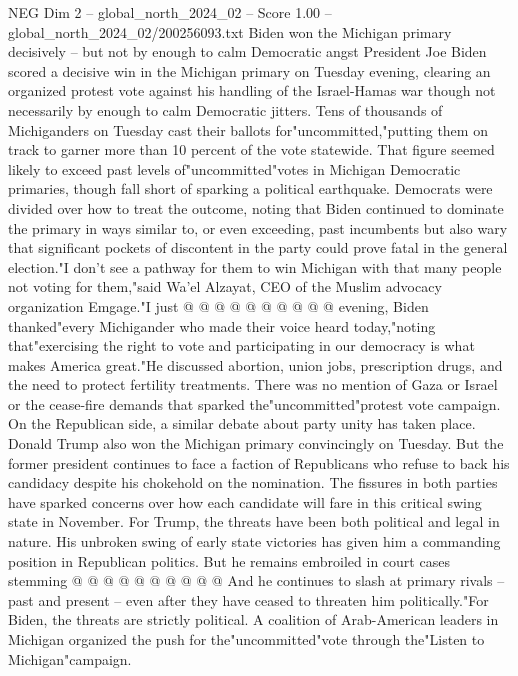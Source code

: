 \begin{textsample}{NEG Dim 2 – global\_north\_2024\_02 – Score 1.00 – global\_north\_2024\_02/200256093.txt}  \label{ex:f2_neg_182}
Biden won the Michigan primary decisively -- but not by enough to calm Democratic angst President Joe Biden scored a decisive win in the Michigan primary on Tuesday evening, clearing an organized protest vote against his handling of the Israel-Hamas war though not necessarily by enough to calm Democratic jitters.
Tens of thousands of Michiganders on Tuesday cast their ballots for"uncommitted,"putting them on track to garner more than 10 percent of the vote statewide.
That figure seemed likely to exceed past levels of"uncommitted"votes in Michigan Democratic primaries, though fall short of sparking a political earthquake.
Democrats were divided over how to treat the outcome, noting that Biden continued to dominate the primary in ways similar to, or even exceeding, past incumbents but also wary that significant pockets of discontent in the party could prove fatal in the general election."I don't see a pathway for them to win Michigan with that many people not voting for them,"said Wa'el Alzayat, CEO of the Muslim advocacy organization Emgage."I just @ @ @ @ @ @ @ @ @ @ evening, Biden thanked"every Michigander who made their voice heard today,"noting that"exercising the right to vote and participating in our democracy is what makes America great."He discussed abortion, union jobs, prescription drugs, and the need to protect fertility treatments.
There was no mention of Gaza or Israel or the cease-fire demands that sparked the"uncommitted"protest vote campaign.
On the Republican side, a similar debate about party unity has taken place.
Donald Trump also won the Michigan primary convincingly on Tuesday.
But the former president continues to face a faction of Republicans who refuse to back his candidacy despite his chokehold on the nomination.
The fissures in both parties have sparked concerns over how each candidate will fare in this critical swing state in November.
For Trump, the threats have been both political and legal in nature.
His unbroken swing of early state victories has given him a commanding position in Republican politics.
But he remains embroiled in court cases stemming @ @ @ @ @ @ @ @ @ @ And he continues to slash at primary rivals -- past and present -- even after they have ceased to threaten him politically."For Biden, the threats are strictly political.
A coalition of Arab-American leaders in Michigan organized the push for the"uncommitted"vote through the"Listen to Michigan"campaign.

\end{textsample}
